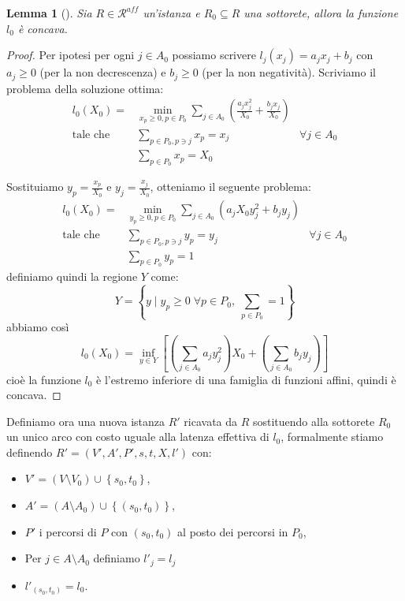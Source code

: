 \documentclass[a4paper]{article}
\theoremstyle{plain}
\newtheorem{mylem}[myteo]{Lemma}
\theoremstyle{definition}
\theoremstyle{remark}
\newcommand{\set}[1]{\left\{#1\right\}}
\newcommand{\pa}[1]{\left(#1\right)}
\newcommand{\bra}[1]{\left[#1\right]}
\begin{document}
\begin{mylem}[{\cite[Lemma 3.11]{menache2011network}}]
  \label{lem:l0-concava}
  Sia $R\in \mathcal{R}^{aff}$ un'istanza e $R_0\subseteq R$ una
  sottorete, allora la funzione $l_0$ è concava.
\end{mylem}
\begin{proof}
  Per ipotesi per ogni $j\in A_0$ possiamo scrivere $l_j\pa{x_j} = a_j
  x_j + b_j$ con $a_j\ge 0$ (per la non decrescenza) e $b_j \ge 0$
  (per la non negatività). Scriviamo il problema della soluzione
  ottima:
  \begin{align*}
    l_0(X_0) = & \min _{x_p \ge 0, p\in P_0}  \sum _{j\in A_0} \pa{
                 \frac{a_j x_j ^2}{X_0} + \frac{b_j x_j}{X_0}} \\
    \text{tale che } & \sum _{p\in P_0, p\ni j} x_p = x_j & \forall j\in A_0
    \\
    & \sum _{p\in P_0} x_p = X_0
  \end{align*}

  Sostituiamo $y_p = \frac{x_p}{X_0}$ e $y_j = \frac{x_j}{X_0}$,
  otteniamo il seguente problema:
  \begin{align*}
    l_0(X_0) = & \min _{y_p \ge 0, p\in P_0}  \sum _{j\in A_0} \pa{
                 a_j X_0 y_j ^2 + b_j y_j} \\
    \text{tale che } & \sum _{p\in P_0, p\ni j} y_p = y_j & \forall j\in A_0
    \\
    & \sum _{p\in P_0} y_p = 1
  \end{align*}
  definiamo quindi la regione $Y$ come:
  \[ Y = \set { y \mid y_p \ge 0\; \forall p \in P_0, \; \sum _{p\in
        P_0} = 1 } \]
  abbiamo così
  \[ l_0\pa{X_0} = \inf _{y\in Y} \bra{ \pa{ \sum _{j\in A_0} a_j
        y_j^2} X_0 + \pa { \sum _{j\in A_0} b_j y_j} } \]
  cioè la funzione $l_0$ è l'estremo inferiore di una famiglia di
  funzioni affini, quindi è concava.
\end{proof}

Definiamo ora una nuova istanza $R'$ ricavata da $R$ sostituendo alla
sottorete $R_0$ un unico arco con costo uguale alla latenza effettiva
di $l_0$, formalmente stiamo definendo $R'=(V',A',P',s,t,X,l')$ con:
\begin{itemize}
\item $V' = \pa{V\setminus V_0}\cup \set{s_0,t_0}$,
\item $A' = \pa{A\setminus A_0}\cup \set{\pa{s_0,t_0}}$,
\item $P'$ i percorsi di $P$ con $\pa{s_0,t_0}$ al posto dei
  percorsi in $P_0$,
\item Per $j\in A\setminus A_0$ definiamo $l'_j = l_j$
\item $l'_{\pa{s_0,t_0}} = l_0$.
\end{itemize}
\end{document}
